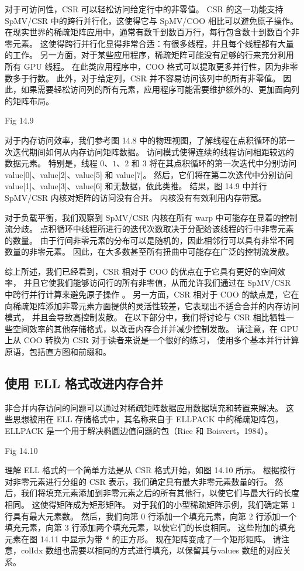 对于可访问性，CSR 可以轻松访问给定行中的非零值。 
CSR 的这一功能支持 SpMV/CSR 中的跨行并行化，这使得它与 SpMV/COO 相比可以避免原子操作。 
在现实世界的稀疏矩阵应用中，通常有数千到数百万行，每行包含数十到数百个非零元素。 
这使得跨行并行化显得非常合适：有很多线程，并且每个线程都有大量的工作。 
另一方面，对于某些应用程序，稀疏矩阵可能没有足够的行来充分利用所有 GPU 线程。 
在此类应用程序中，COO 格式可以提取更多并行性，因为非零数多于行数。 
此外，对于给定列，CSR 并不容易访问该列中的所有非零值。 
因此，如果需要轻松访问列的所有元素，应用程序可能需要维护额外的、更加面向列的矩阵布局。

{\color{red} Fig 14.9}

对于内存访问效率，我们参考图 14.8 中的物理视图，了解线程在点积循环的第一次迭代期间如何从内存访问矩阵数据。 
访问模式使得连续的线程访问相距较远的数据元素。 
特别是，线程 $0、1、2$ 和 3 将在其点积循环的第一次迭代中分别访问 value[0]、value[2]、value[5] 和 value[7]。 
然后，它们将在第二次迭代中分别访问 value[1]、value[3]、value[6] 和无数据，依此类推。 
结果，图 14.9 中并行 SpMV/CSR 内核对矩阵的访问没有合并。 内核没有有效利用内存带宽。

对于负载平衡，我们观察到 SpMV/CSR 内核在所有 warp 中可能存在显着的控制流分歧。 
点积循环中线程所进行的迭代次数取决于分配给该线程的行中非零元素的数量。 由于行间非零元素的分布可以是随机的，因此相邻行可以具有非常不同数量的非零元素。 因此，在大多数甚至所有扭曲中可能存在广泛的控制流发散。

综上所述，我们已经看到，CSR 相对于 COO 的优点在于它具有更好的空间效率，
并且它使我们能够访问行的所有非零值，从而允许我们通过在 SpMV/CSR 中跨行并行计算来避免原子操作 。 
另一方面，CSR 相对于 COO 的缺点是，它在向稀疏矩阵添加非零元素方面提供的灵活性较差，它表现出不适合合并的内存访问模式，
并且会导致高控制发散。 在以下部分中，我们将讨论与 CSR 相比牺牲一些空间效率的其他存储格式，以改善内存合并并减少控制发散。 
请注意，在 GPU 上从 $\mathrm{COO}$ 转换为 CSR 对于读者来说是一个很好的练习，
使用多个基本并行计算原语，包括直方图和前缀和。

\subsection{使用 ELL 格式改进内存合并}
非合并内存访问的问题可以通过对稀疏矩阵数据应用数据填充和转置来解决。 
这些思想被用在 ELL 存储格式中，其名称来自于 ELLPACK 中的稀疏矩阵包，
ELLPACK 是一个用于解决椭圆边值问题的包（Rice 和 Boisvert，1984）。

{\color{red} Fig 14.10}

理解 ELL 格式的一个简单方法是从 CSR 格式开始，如图 14.10 所示。 
根据按行对非零元素进行分组的 CSR 表示，我们确定具有最大非零元素数量的行。 
然后，我们将填充元素添加到非零元素之后的所有其他行，以使它们与最大行的长度相同。 这使得矩阵成为矩形矩阵。 
对于我们的小型稀疏矩阵示例，我们确定第 1 行具有最大元素数。 
然后，我们向第 0 行添加一个填充元素，向第 2 行添加一个填充元素，向第 3 行添加两个填充元素，以使它们的长度相同。 
这些附加的填充元素在图 14.11 中显示为带 * 的正方形。 现在矩阵变成了一个矩形矩阵。 
请注意，colIdx 数组也需要以相同的方式进行填充，以保留其与values 数组的对应关系。

